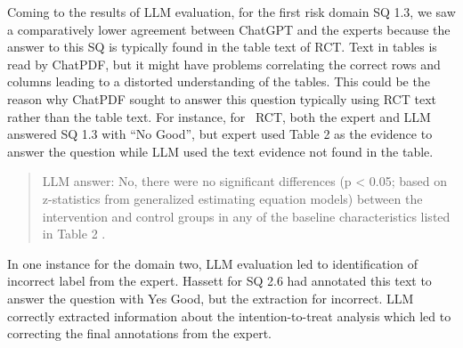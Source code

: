 \documentclass[sn-mathphys,Numbered]{sn-jnl}%
\theoremstyle{thmstyleone}%
\theoremstyle{thmstyletwo}%
\theoremstyle{thmstylethree}%
\begin{document}
Coming to the results of LLM evaluation, for the first risk domain SQ 1.3, we saw a comparatively lower agreement between ChatGPT and the experts because the answer to this SQ is typically found in the table text of RCT.
Text in tables is read by ChatPDF, but it might have problems correlating the correct rows and columns leading to a distorted understanding of the tables.
This could be the reason why ChatPDF sought to answer this question typically using RCT text rather than the table text.
For instance, for~\cite{stuck2015effect} RCT, both the expert and LLM answered SQ 1.3 with ``No Good'', but expert used Table 2 as the evidence to answer the question while LLM used the text evidence not found in the table.

\begin{quote}
    LLM answer: No, there were no significant differences (p < 0.05; based on z-statistics from generalized estimating equation models) between the intervention and control groups in any of the baseline characteristics listed in Table 2 .
\end{quote}


In one instance for the domain two, LLM evaluation led to identification of incorrect label from the expert. 
Hassett for SQ 2.6 had annotated this text to answer the question with Yes Good, but the extraction for incorrect.
LLM correctly extracted information about the intention-to-treat analysis which led to correcting the final annotations from the expert.






%
%
%
\end{document}
